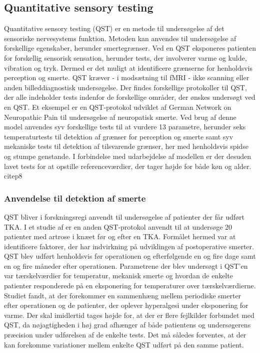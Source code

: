\subsection{Quantitative sensory testing}
Quantitative sensory testing (QST) er en metode til undersøgelse af det sensoriske nervesystems funktion. Metoden kan anvendes til undersøgelse af forskellige egenskaber, herunder smertegrænser. Ved en QST eksponeres patienten for forskellig sensorisk sensation, herunder tests, der involverer varme og kulde, vibration og tryk. Dermed er det muligt at identificere grænserne for henholdsvis perception og smerte. \citep{Yarnitsky2006} QST kræver - i modsætning til fMRI - ikke scanning eller anden billeddiagnostisk undersøgelse. 
Der findes forskellige protokoller til QST, der alle indeholder tests indenfor de forskellige områder, der ønskes undersøgt ved en QST. Et eksempel er en QST-protokol udviklet af German Network on Neuropathic Pain til undersøgelse af neuropatisk smerte. Ved brug af denne model anvendes syv forskellige tests til at vurdere 13 parametre, herunder seks temperaturtests til detektion af grænser for perception og smerte samt syv mekaniske tests til detektion af tilsvarende grænser, her med henholdsvis spidse og stumpe genstande. I forbindelse med udarbejdelse af modellen er der desuden lavet tests for at opstille referenceværdier, der tager højde for både køn og alder. citep{8}  

\subsubsection{Anvendelse til detektion af smerte}
QST bliver i forskningsregi anvendt til undersøgelse af patienter der får udført TKA. I et studie af \citep{Martinez2007} er en anden QST-protokol anvendt til at undersøge 20 patienter med artrose i knæet før og efter en TKA. Formålet hermed var at identificere faktorer, der har indvirkning på udviklingen af postoperative smerter. QST blev udført henholdsvis før operationen og efterfølgende en og fire dage samt en og fire måneder efter operationen. Parametrene der blev undersøgt i QST'en var tærskelværdier for temperatur, mekanisk smerte og hvordan de enkelte patienter responderede på en eksponering for temperaturer over tærskelværdierne. Studiet fandt, at der forekommer en sammenhæng mellem periodiske smerter efter operationen og de patienter, der oplever hyperalgesi under eksponering for varme. \citep{Martinez2007} Der skal imidlertid tages højde for, at der er flere fejlkilder forbundet med QST, da nøjagtigheden i høj grad afhænger af både patientens og undersøgerens præcision under udførelsen af de enkelte tests. Det må således forventes, at der kan forekomme variationer mellem enkelte QST udført på den samme patient. \citep{Yarnitsky2006}

